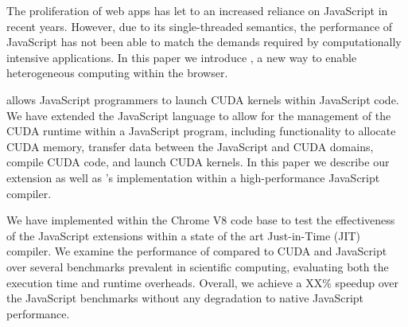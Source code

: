 
The proliferation of web apps has let to an increased reliance on JavaScript in
recent years. However, due to its single-threaded semantics, the performance of
JavaScript has not been able to match the demands required by computationally
intensive applications. In this paper we introduce \namens, a new way to enable
heterogeneous computing within the browser.

\name allows JavaScript programmers to launch CUDA kernels within JavaScript
code. We have extended the JavaScript language to allow for the management of
the CUDA runtime within a JavaScript program, including functionality to
allocate CUDA memory, transfer data between the JavaScript and CUDA domains,
compile CUDA code, and launch CUDA kernels. In this paper we describe our
extension as well as \namens's implementation within a high-performance
JavaScript compiler.

We have implemented \name within the Chrome V8 code base to test the
effectiveness of the JavaScript extensions within a state of the art
Just-in-Time (JIT) compiler. We examine the performance of \name compared to
CUDA and JavaScript over several benchmarks prevalent in scientific computing,
evaluating both the execution time and runtime overheads.  Overall, we achieve a
XX\% speedup over the JavaScript benchmarks without any degradation to native
JavaScript performance.

